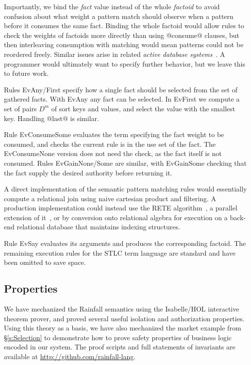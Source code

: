 Importantly, we bind the \emph{fact} value instead of the whole \emph{factoid} to avoid confusion about what weight a pattern match should observe when a pattern before it consumes the same fact. Binding the whole factoid would allow rules to check the weights of factoids more directly than using @consume@ clauses, but then interleaving consumption with matching would mean patterns could not be reordered freely. Similar issues arise in related \emph{active database systems}~\cite{Paton1999:Active}. A programmer would ultimately want to specify further behavior, but we leave this to future work.

Rules EvAny/First specify how a single fact should be selected from the set of gathered facts. With EvAny any fact can be selected. In EvFirst we compute a set of pairs $D^m$ of sort keys and values, and select the value with the smallest key. Handling @last@ is similar.

Rule EvConsumeSome evaluates the term specifying the fact weight to be consumed, and checks the current rule is in the use set of the fact. The EvConsumeNone version does not need the check, as the fact itself is not consumed. Rules EvGainNone/Some are similar, with EvGainSome checking that the fact supply the desired authority before returning it.

A direct implementation of the semantic pattern matching rules would essentially compute a relational join using naive cartesian product and filtering. A production implementation could instead use the RETE algorithm~\cite{Forgy1981:RETE, Doorenbos1995:ProductionMatching}, a parallel extension of it~\cite{Aref1998:LanaMatch}, or by conversion onto relational algebra for execution on a back-end relational database that maintains indexing structures.

Rule EvSay evaluates its arguments and produces the corresponding factoid. The remaining execution rules for the STLC term language are standard and have been omitted to save space.




\eject{}
\subsection{Properties}
\label{s:Properties}
We have mechanized the Rainfall semantics using the Isabelle/HOL interactive theorem prover, and proved several useful isolation and authorization properties. Using this theory as a basis, we have also mechanized the market example from \S\ref{s:Selection} to demonstrate how to prove safety properties of business logic encoded in our system. The proof scripts and full statements of invariants are available at
\url{http://github.com/rainfall-lang}.


